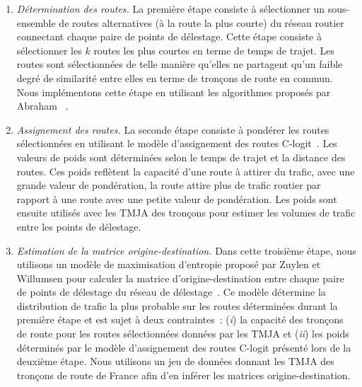  
\begin{enumerate} 
    \item \textit{Détermination des routes.}  
    La première étape consiste à sélectionner un sous-ensemble de routes alternatives (à la route la plus courte) du réseau routier connectant chaque paire de points de délestage. Cette étape consiste à sélectionner les $k$ routes les plus courtes en terme de temps de trajet. Les routes sont sélectionnées de telle manière qu’elles ne partagent qu’un faible degré de similarité entre elles en terme de tronçons de route en commun. Nous implémentons cette étape en utilisant les algorithmes proposés par Abraham \etal~\cite{abraham2013alternative}. 

    \item \textit{Assignement des routes.}  
    La seconde étape consiste à pondérer les routes sélectionnées en utilisant le modèle d’assignement des routes C-logit~\cite{cascetta1996modified}. Les valeurs de poids sont déterminées selon le temps de trajet et la distance des routes. Ces poids reflètent la capacité d’une route à attirer du trafic, avec une grande valeur de pondération, la route attire plus de trafic routier par rapport à une route avec une petite valeur de pondération. Les poids sont ensuite utilisés avec les TMJA des tronçons pour estimer les volumes de trafic entre les points de délestage. 
 
    \item \textit{Estimation de la matrice origine-destination.} 
    Dans cette troisième étape, nous utilisons un modèle de maximisation d’entropie proposé par Zuylen et Willumsen pour calculer la matrice d’origine-destination entre chaque paire de points de délestage du réseau de délestage~\cite{van1980most}. Ce modèle détermine la distribution de trafic la plus probable sur les routes déterminées durant la première étape et est sujet à deux contraintes~: (\textit{i}) la capacité des tronçons de route pour les routes sélectionnées données par les TMJA et (\textit{ii}) les poids déterminés par le modèle d’assignement des routes C-logit présenté lors de la deuxième étape. Nous utilisons un jeu de données donnant les TMJA des tronçons de route de France afin d’en inférer les matrices origine-destination. 
 
\end{enumerate} 
 
